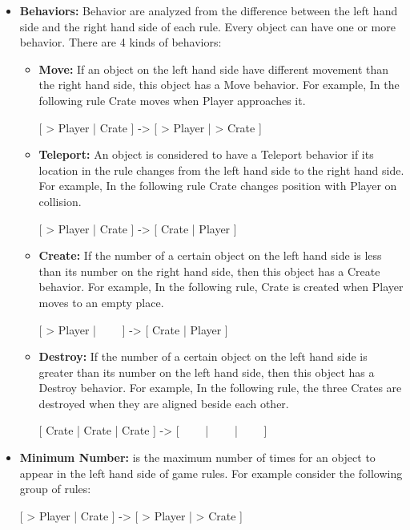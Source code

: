 \begin{itemize}
	\item \textbf{Behaviors:} Behavior are analyzed from the difference between the left hand side and the right hand side of each rule. Every object can have one or more behavior. There are 4 kinds of behaviors:
		\begin{itemize} \itemsep0pt \parskip0pt 
			\item \textbf{Move:} If an object on the left hand side have different movement than the right hand side, this object has a Move behavior. For example, In the following rule Crate moves when Player approaches it.
			\begin{center}
				[ > Player | Crate ] -> [ > Player | > Crate ]
			\end{center}
			\item \textbf{Teleport:} An object is considered to have a Teleport behavior if its location in the rule changes from the left hand side to the right hand side. For example, In the following rule Crate changes position with Player on collision.
			\begin{center}
				[ > Player | Crate ] -> [ Crate | Player ]
			\end{center}
			\item \textbf{Create:} If the number of a certain object on the left hand side is less than its number on the right hand side, then this object has a Create behavior. For example, In the following rule, Crate is created when Player moves to an empty place.
			\begin{center}
				[ > Player | \ \ \ \ ] -> [ Crate | Player ]
			\end{center}
			\item \textbf{Destroy:} If the number of a certain object on the left hand side is greater than its number on the left hand side, then this object has a Destroy behavior. For example, In the following rule, the three Crates are destroyed when they are aligned beside each other.
			\begin{center}
				[ Crate | Crate | Crate ] -> [ \ \ \ \ | \ \ \ \ | \ \ \ \ ]
			\end{center}
		\end{itemize}
	\item \textbf{Minimum Number:} is the maximum number of times for an object to appear in the left hand side of game rules. For example consider the following group of rules:
	\begin{center}
		[ > Player | Crate ] -> [ > Player | > Crate ]
	\end{center}

\end{itemize}
